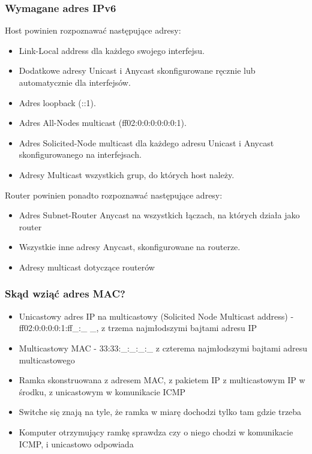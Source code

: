 \documentclass[12pt]{article}
\begin{document}
    \subsubsection{Wymagane adres IPv6}
    Host powinien rozpoznawać następujące adresy:
    \begin{itemize}
        \item Link-Local address dla każdego swojego interfejsu.
        \item Dodatkowe adresy Unicast i Anycast skonfigurowane ręcznie lub automatycznie dla interfejsów.
        \item Adres loopback (::1).
        \item Adres All-Nodes multicast (ff02:0:0:0:0:0:0:1).
        \item Adres Solicited-Node multicast dla każdego adresu Unicast i Anycast skonfigurowanego na interfejsach.
        \item Adresy Multicast wszystkich grup, do których host należy.
    \end{itemize}

    Router powinien ponadto rozpoznawać następujące adresy:
    \begin{itemize}
        \item Adres Subnet-Router Anycast na wszystkich łączach, na których działa jako router
        \item Wszystkie inne adresy Anycast, skonfigurowane na routerze.
        \item Adresy multicast dotyczące routerów
    \end{itemize}

    \subsubsection{Skąd wziąć adres MAC?}
    \begin{itemize}
        \item Unicastowy adres IP na multicastowy (Solicited Node Multicast address) - ff02:0:0:0:0:1:ff\_:\_ \_,
        z trzema najmłodszymi bajtami adresu IP
        \item Multicastowy MAC - 33:33:\_:\_:\_:\_ z czterema najmłodszymi bajtami adresu multicastowego
        \item Ramka skonstruowana z adresem MAC, z pakietem IP z multicastowym IP w środku, z unicastowym w komunikacie ICMP
        \item Switche się znają na tyle, że ramka w miarę dochodzi tylko tam gdzie trzeba
        \item Komputer otrzymujący ramkę sprawdza czy o niego chodzi w komunikacie ICMP, i unicastowo odpowiada
    \end{itemize}
\end{document}
